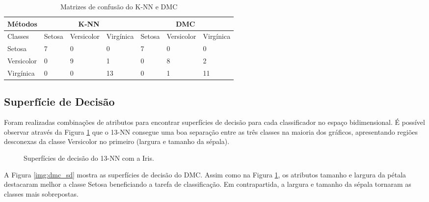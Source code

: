 \documentclass{article}
\begin{document}
\begin{table}[h]
\begin{tabular}{|l|l|l|l|l|l|l|}
\hline
Métodos    & \multicolumn{3}{c|}{\textbf{K-NN}} & \multicolumn{3}{c|}{\textbf{DMC}} \\ \hline
Classes    & Setosa  & Versicolor  & Virgínica  & Setosa  & Versicolor  & Virgínica \\ \hline
Setosa     & 7       & 0           & 0          & 7       & 0           & 0         \\ \hline
Versicolor & 0       & 9           & 1          & 0       & 8           & 2         \\ \hline
Virgínica  & 0       & 0           & 13         & 0       & 1           & 11        \\ \hline
\end{tabular}
\caption{Matrizes de confusão do K-NN e DMC}\label{tab:matriz_knn_dmc}
\end{table}

\subsection{Superfície de Decisão}
Foram realizadas combinações de atributos para encontrar superfícies de decisão para cada classificador no espaço bidimensional. É possível observar através da Figura \ref{img:knn_sd} que o 13-NN consegue uma boa separação entre as três classes na maioria dos gráficos, apresentando regiões desconexas da classe Versicolor no primeiro (largura e tamanho da sépala).


\begin{figure}[!h]
\begin{center}
\caption{Superfícies de decisão do 13-NN com a Iris.}
\label{img:knn_sd}
\end{center}
\end{figure}

A Figura \ref{img:dmc_sd} mostra as superfícies de decisão do DMC. Assim como na Figura \ref{img:knn_sd}, os atributos tamanho e largura da pétala destacaram melhor a classe Setosa beneficiando a tarefa de classificação. Em contrapartida, a largura e tamanho da sépala tornaram as classes mais sobrepostas. 
\end{document}
